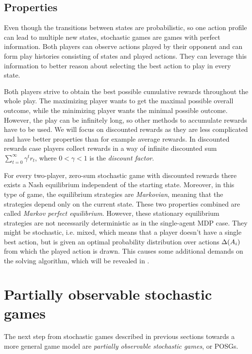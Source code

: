 \documentclass[../main.tex]{subfiles}
\begin{document}
\subsection{Properties}\label{bg:sg:properties}
Even though the transitions between states are probabilistic, so one action profile can lead to multiple new states, stochastic games are games with perfect information.
Both players can observe actions played by their opponent and can form play histories consisting of states and played actions.
They can leverage this information to better reason about selecting the best action to play in every state.

Both players strive to obtain the best possible cumulative rewards throughout the whole play.
The maximizing player wants to get the maximal possible overall outcome, while the minimizing player wants the minimal possible outcome.
However, the play can be infinitely long, so other methods to accumulate rewards have to be used.
We will focus on discounted rewards as they are less complicated and have better properties than for example average rewards.
In discounted rewards case players collect rewards in a way of infinite discounted sum $\sum_{t=0}^{\infty} \gamma^t r_t$, where $0 < \gamma < 1$ is the \textit{discount factor}.

For every two-player, zero-sum stochastic game with discounted rewards there exists a Nash equilibrium independent of the starting state.
Moreover, in this type of game, the equilibrium strategies are \textit{Markovian}, meaning that the strategies depend only on the current state.
These two properties combined are called \textit{Markov perfect equilibrium}.
However, these stationary equilibrium strategies are not necessarily deterministic as in the single-agent MDP case.
They might be stochastic, i.e. mixed, which means that a player doesn't have a single best action, but is given an optimal probability distribution over actions $\Delta(A_i)$ from which the played action is drawn.
This causes some additional demands on the solving algorithm, which will be revealed in .

\section{Partially observable stochastic games}\label{bg:posg}
The next step from stochastic games described in previous sections towards a more general game model are \textit{partially observable stochastic games}, or POSGs.
\end{document}
